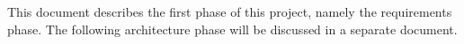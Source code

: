 This document describes the first phase of this project, namely the requirements phase. The following architecture phase will be discussed in a separate document.


